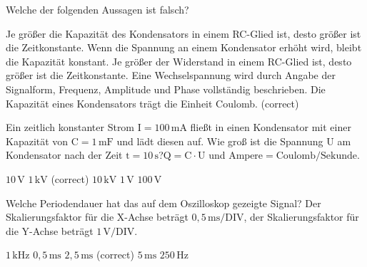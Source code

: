 \documentclass[11pt]{exam}
\begin{document}
\setlength{\voffset}{-0.5in}
\setlength{\headsep}{5pt}

\hspace{2mm}
 \hspace{5mm}
\vspace{4mm}

\begin{questions}

\question Welche der folgenden Aussagen ist falsch?

\begin{choices}
	\choice Je größer die Kapazität des Kondensators in einem RC-Glied ist, desto größer ist die Zeitkonstante.
	\choice Wenn die Spannung an einem Kondensator erhöht wird, bleibt die Kapazität konstant.
	\choice Je größer der Widerstand in einem RC-Glied ist, desto größer ist die Zeitkonstante.
	\choice Eine Wechselspannung wird durch Angabe der Signalform, Frequenz, Amplitude und Phase vollständig beschrieben.
	\choice Die Kapazität eines Kondensators trägt die Einheit Coulomb. (correct)
\end{choices}

\vspace{3mm}\question Ein zeitlich konstanter Strom \(\mathrm{I=100\,mA}\) fließt in einen Kondensator mit einer Kapazität von \(\mathrm{C=1\,mF}\) und lädt diesen auf. Wie groß ist die Spannung \(\mathrm{U}\) am Kondensator nach der Zeit \(\mathrm{t=10\,s}\)?\(\mathrm{Q=C \cdot U}\) und \(\mathrm{Ampere=Coulomb/Sekunde}\).

\begin{choices}
	\choice \(\mathrm{10\,V}\)
	\choice \(\mathrm{1\,kV}\) (correct)
	\choice \(\mathrm{10\,kV}\)
	\choice \(\mathrm{1\,V}\)
	\choice \(\mathrm{100\,V}\)
\end{choices}

\vspace{3mm}\question Welche Periodendauer hat das auf dem Oszilloskop gezeigte Signal? Der Skalierungsfaktor für die X-Achse beträgt \(\mathrm{0,5\,ms/DIV}\), der Skalierungsfaktor für die Y-Achse beträgt \(\mathrm{1\,V/DIV}\).

\begin{choices}
	\choice \(\mathrm{1\,kHz}\)
	\choice \(\mathrm{0,5\,ms}\)
	\choice \(\mathrm{2,5\,ms}\) (correct)
	\choice \(\mathrm{5\,ms}\)
	\choice \(\mathrm{250\,Hz}\)
\end{choices}


\end{questions}
\end{document}
